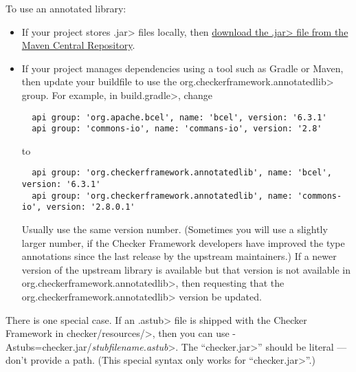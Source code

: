 To use an annotated library:

\begin{itemize}
\item
If your project stores \<.jar> files locally, then
\href{https://search.maven.org/search?q=org.checkerframework.annotatedlib}{download
  the \<.jar> file from the Maven Central Repository}.

\item
If your project manages dependencies using a tool such as Gradle or Maven,
then update your buildfile to use the \<org.checkerframework.annotatedlib>
group.  For example, in \<build.gradle>, change

\begin{Verbatim}
  api group: 'org.apache.bcel', name: 'bcel', version: '6.3.1'
  api group: 'commons-io', name: 'commans-io', version: '2.8'
\end{Verbatim}

\noindent
to

\begin{Verbatim}
  api group: 'org.checkerframework.annotatedlib', name: 'bcel', version: '6.3.1'
  api group: 'org.checkerframework.annotatedlib', name: 'commons-io', version: '2.8.0.1'
\end{Verbatim}

\noindent
Usually use the same version number.  (Sometimes you will use a slightly larger
number, if the Checker Framework developers have improved the type
annotations since the last release by the upstream maintainers.)  If a
newer version of the upstream library is available but that version is not
available in \<org.checkerframework.annotatedlib>, then
 requesting that the
\<org.checkerframework.annotatedlib> version be updated.
\end{itemize}


There is one special case.  If an \<.astub> file is shipped with the
Checker Framework in \<checker/resources/>, then you can
use \<-Astubs=checker.jar/\emph{stubfilename.astub}>.
The ``\<checker.jar>'' should be literal --- don't provide a path.
(This special syntax only works for ``\<checker.jar>''.)


